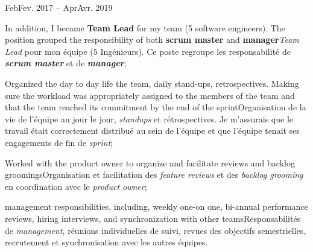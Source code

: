 \documentclass[a4paper]{article}
\newcommand\enfr[2]{\ifdefined\doen#1\else#2\fi\xspace}
\newcommand\timespan[2]{\normalsize\textsf{#1 -- #2}}
\begin{document}
\begin{minipage}[t]{0.63\textwidth}
\vspace{0.5em}
\timespan{\enfr{Feb}{Fev}. 2017}{\enfr{Apr}{Avr}. 2019}
\begin{compactitem}
\item[\textbullet] \enfr{In addition, I became \textbf{Team Lead} for my team (5
software engineers). The position grouped the responsibility of
both \textbf{scrum master} and \textbf{manager}}
  {\textit{Team Lead} pour mon équipe (5 Ingénieurs). Ce poste
    regroupe les responsabilité de \textit{\textbf{scrum master}} et
    de \textit{\textbf{manager}}};
\item[\textbullet] \enfr{Organized the day to day life the team, daily
  stand-ups, retrospectives. Making sure the workload was
  appropriately assigned to the members of the team and that the team
  reached its commitment by the end of the sprint}
  {Organisation de la vie de l'équipe au jour le jour,
    \textit{standups} et rétrospectives. Je m'assurais que le travail
    était correctement distribué au sein de l'équipe et que l'équipe
    tenait ses engagements de fin de \textit{sprint}};
\item[\textbullet] \enfr{Worked with the product owner to organize and
  facilitate reviews and backlog groomings}
  {Organisation et facilitation des \textit{feature reviews} et des
    \textit{backlog grooming} en coordination avec le \textit{product
      owner}};
\item[\textbullet] \enfr{management responsibilities, including,
  weekly one-on one, bi-annual performance reviews, hiring interviews,
  and synchronization with other teams}
  {Responsabilités de \textit{management}, réunions individuelles de
    suivi, revues des objectifs semestrielles, recrutement et
    synchronisation avec les autres équipes}.
\end{compactitem}


\end{minipage}
\end{document}
